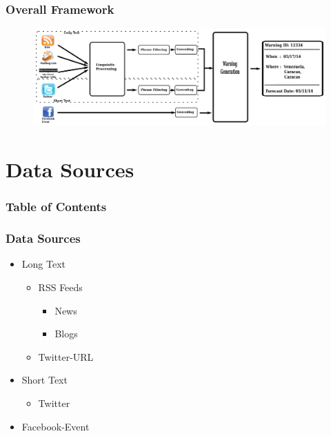 \documentclass[red]{beamer}
\begin{document}
\begin{frame}
\frametitle{Overall Framework}
\begin{figure}
    \centering
    \includegraphics[height=0.6\textheight,width=\textwidth]{pipeline}
\end{figure}
\end{frame}


\section{Data Sources}

\begin{frame}
\frametitle{Table of Contents}
\tableofcontents[currentsection]
\end{frame}
\begin{frame}
    \frametitle{Data Sources}
    \begin{itemize}
        \item
            Long Text
            \begin{itemize}
                \item
                    RSS Feeds
                    \begin{itemize}
                        \item
                            News
                        \item
                            Blogs
                    \end{itemize}
                \item
                    Twitter-URL
            \end{itemize}
        \item
            Short Text
                \begin{itemize}
                    \item
                        Twitter
                \end{itemize}
        \item
            Facebook-Event

    \end{itemize}
\end{frame}
\end{document}
